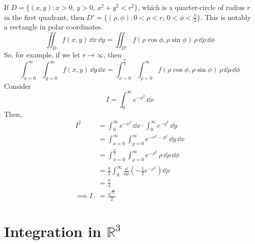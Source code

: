 \documentclass{article}
\begin{document}
If $D = \{ (x, y) \colon x > 0,\, y > 0,\, x^2 + y^2 < r^2 \}$, which is a quarter-circle of radius $r$ in the first quadrant, then $D' = \{ (\rho, \phi) \colon 0 < \rho < r,\, 0 < \phi < \frac{\pi}{2} \}$. This is notably a rectangle in polar coordinates.
\[ \iint_D f(x, y)\,\dd x \,\dd y = \iint_{D'} f(\rho \cos \phi, \rho \sin \phi) \,\rho \,\dd \rho \,\dd \phi \]
So, for example, if we let $r \to \infty$, then
\[ \int_{x=0}^\infty \int_{y=0}^\infty f(x, y) \,\dd y\,\dd x = \int_{\phi = 0}^{\frac{\pi}{2}} \int_{\rho = 0}^\infty f(\rho \cos \phi, \rho \sin \phi) \,\rho\,\dd \rho\,\dd \phi \]
Consider
\[ I = \int_0^\infty e^{-x^2} \,\dd x \]
Then,
\begin{align*}
    I^2        & = \int_0^\infty e^{-x^2} \,\dd x \cdot \int_0^\infty e^{-y^2} \,\dd y                              \\
               & = \int_{x=0}^\infty \int_{y=0}^\infty e^{-x^2-y^2} \,\dd y\,\dd x                                  \\
               & = \int_{\phi = 0}^{\frac{\pi}{2}} \int_{\rho = 0}^\infty e^{-\rho^2} \,\rho\,\dd \rho\,\dd \phi    \\
               & = \frac{\pi}{2} \int_0^\infty \frac{\dd}{\dd \rho} \left( -\frac{1}{2}e^{-\rho^2} \right) \dd \rho \\
               & = \frac{\pi}{4}                                                                                    \\
    \implies I & = \frac{\sqrt{\pi}}{2}
\end{align*}

\section{Integration in $\mathbb R^3$}
\end{document}

